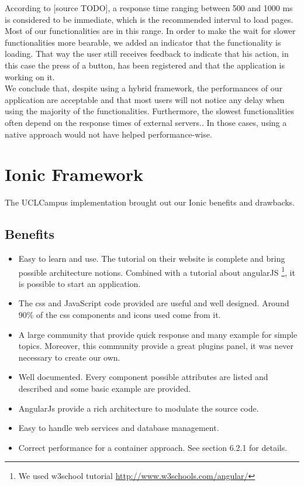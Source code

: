 \documentclass{eplmastersthesis}
\begin{document}
According to [source TODO], a response time ranging between 500 and 1000 ms is considered to be immediate, which is the recommended interval to load pages. Most of our functionalities are in this range. In order to make the wait for slower functionalities more bearable, we added an indicator that the functionality is loading. That way the user still receives feedback to indicate that his action, in this case the press of a button, has been registered and that the application is working on it. \\

We conclude that, despite using a hybrid framework, the performances of our application are acceptable and that most users will not notice any delay when using the majority of the functionalities. Furthermore, the slowest functionalities often depend on the response times of external servers.. In those cases, using a native approach would not have helped performance-wise. 

\section{Ionic Framework}
The UCLCampus implementation brought out our Ionic benefits and drawbacks.
\subsection{Benefits}
\begin{itemize}
\item Easy to learn and use. The tutorial on their website is complete and bring possible architecture notions. Combined with a tutorial about angularJS \footnote{We used w3school tutorial \url{http://www.w3schools.com/angular/}}, it is possible to start an application. 
\item The css and JavaScript code provided are useful and well designed. Around 90\% of the css components and icons used come from it.
\item A large community that provide quick response and many example for simple topics. Moreover, this community provide a great plugins panel, it was never necessary to create our own. 
\item Well documented. Every component possible attributes are listed and described and some basic example are provided.
\item AngularJs provide a rich architecture to modulate the source code. 
\item Easy to handle web services and database management. 
\item Correct performance for a container approach. See section 6.2.1 for details.
\end{itemize}
\end{document}

